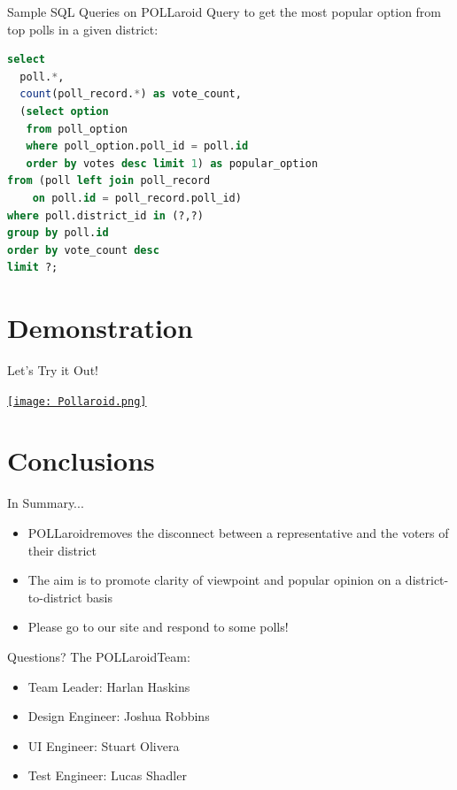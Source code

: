 \documentclass[11pt,aps,prb,groupedaddress,nofootinbib,floatfix]{beamer}
\newcommand{\pollaroid}{POLLaroid}
\begin{document}
%
%
\begin{frame}[fragile]{Sample SQL Queries on \pollaroid}
Query to get the most popular option from top polls  in a given district:
\begin{lstlisting}[language=SQL,basicstyle=\small]
select
  poll.*,
  count(poll_record.*) as vote_count,
  (select option
   from poll_option
   where poll_option.poll_id = poll.id
   order by votes desc limit 1) as popular_option
from (poll left join poll_record
    on poll.id = poll_record.poll_id)
where poll.district_id in (?,?)
group by poll.id
order by vote_count desc
limit ?;
\end{lstlisting}
\end{frame}

\section{Demonstration}


%
%
\begin{frame}[t]{Let's Try it Out!}
\begin{center}
\href{https://pollaroid.club/}{\texttt{[image: Pollaroid.png]}}
\end{center}
\end{frame}

\section{Conclusions}


%
%
\begin{frame}{In Summary...}
\begin{itemize}
	\item \pollaroid removes the disconnect between a representative and the voters of their district
	\item The aim is to promote clarity of viewpoint and popular opinion on a district-to-district basis
	\item Please go to our site and respond to some polls!
\end{itemize}
\end{frame}

\begin{frame}{Questions?}
The \pollaroid Team:
\begin{itemize}
	\item Team Leader: Harlan Haskins
	\item Design Engineer: Joshua Robbins
	\item UI Engineer: Stuart Olivera
	\item Test Engineer: Lucas Shadler
\end{itemize}
\end{frame}
\end{document}
